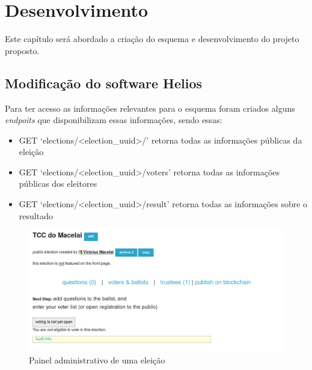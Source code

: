 \documentclass{ufsctex/ufsctex}
\begin{document}
\begin{lstlisting}[numbers=none]
\end{lstlisting}

\chapter{Desenvolvimento}

Este capítulo será abordado a criação do esquema e desenvolvimento do projeto
proposto.

\section{Modificação do software Helios}
Para ter acesso as informações relevantes para o esquema foram criados alguns
\textit{endpoits} que disponibilizam essas informações, sendo essas:

\begin{itemize}
	\item GET `elections/<election\_uuid>/' retorna todas as informações públicas da eleição
	\item GET `elections/<election\_uuid>/voters' retorna todas as informações públicas dos eleitores
	\item GET `elections/<election\_uuid>/result' retorna todas as informações sobre o resultado
\end{itemize}


\begin{figure}[H]
	\centering
	\includegraphics[width=\linewidth]{helios-1}
	\caption{Painel administrativo de uma eleição}
	\label{fig:helios-1}
\end{figure}
\end{document}
